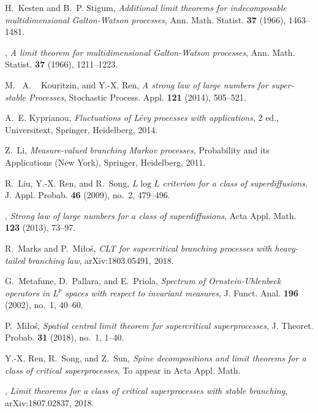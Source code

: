 \documentclass[12pt,a4paper]{amsart}
\theoremstyle{plain}
\theoremstyle{definition}
\numberwithin{equation}{section}
\begin{document}
\begin{thebibliography}{10}
H.~Kesten and B.~P. Stigum, \emph{Additional limit theorems for indecomposable
  multidimensional {G}alton-{W}atson processes}, Ann. Math. Statist.
  \textbf{37} (1966), 1463--1481.

\bysame, \emph{A limit theorem for multidimensional {G}alton-{W}atson
  processes}, Ann. Math. Statist. \textbf{37} (1966), 1211--1223.

 M. ~A. ~ Kouritzin, and  Y.-X. Ren,  \emph{A strong law of large numbers for super-stable Processes},  Stochastic Process. Appl.  \textbf{121} (2014),  505--521.

A.~E. Kyprianou, \emph{Fluctuations of {L}\'{e}vy processes with applications},
  2 ed., Universitext, Springer, Heidelberg, 2014.

Z.~Li, \emph{Measure-valued branching {M}arkov processes}, Probability and its
  Applications (New York), Springer, Heidelberg, 2011.

R.~Liu, Y.-X. Ren, and R.~Song, \emph{{$L\log L$} criterion for a class of
  superdiffusions}, J. Appl. Probab. \textbf{46} (2009), no.~2, 479--496.

\bysame, \emph{Strong law of large numbers for a
  class of superdiffusions}, Acta Appl. Math. \textbf{123} (2013), 73--97.

R.~Marks and P.~Mi{\l}o{\'s}, \emph{C{LT} for supercritical branching processes
  with heavy-tailed branching law}, arXiv:1803.05491, 2018.

G.~Metafune, D.~Pallara, and E.~Priola, \emph{Spectrum of
  {O}rnstein-{U}hlenbeck operators in {$L^p$} spaces with respect to invariant
  measures}, J. Funct. Anal. \textbf{196} (2002), no.~1, 40--60.

P.~Mi{\l}o{\'s},
\emph{Spatial central limit theorem for supercritical superprocesses},
 J. Theoret. Probab. \textbf{31} (2018), no.~1, 1--40.

Y.-X. Ren, R.~Song, and Z.~Sun, \emph{Spine decompositions and limit theorems
  for a class of critical superprocesses},
  To appear in Acta Appl. Math.

\bysame, \emph{Limit theorems for a class of critical superprocesses with stable branching},
    arXiv:1807.02837, 2018.


\end{thebibliography}
\end{document}
